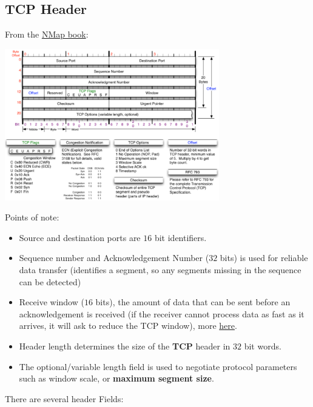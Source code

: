 \subsection{TCP Header}
From the \href{https://nmap.org/book/}{NMap book}:
\begin{center}\includegraphics[width=0.7\textwidth]{transport_layer/images/nmap book.png}\end{center}
Points of note:
\begin{itemize}
    \setlength\itemsep{0em}
    \item Source and destination ports are $16$ bit identifiers.
    \item Sequence number and Acknowledgement Number ($32$ bits) is used for reliable data transfer (identifies a segment, so any segments missing in the sequence can be detected)
    \item Receive window ($16$ bits), the amount of data that can be sent before an acknowledgement is received (if the receiver cannot process data as fast as it arrives, it will ask to reduce the TCP window), more \href{https://accedian.com/blog/tcp-receive-window-everything-need-know/}{here}.
    \item Header length determines the size of the \textbf{TCP} header in $32$ bit words.
    \item The optional/variable length field is used to negotiate protocol parameters such as window scale, or \textbf{maximum segment size}.
\end{itemize}
There are several header Fields:

